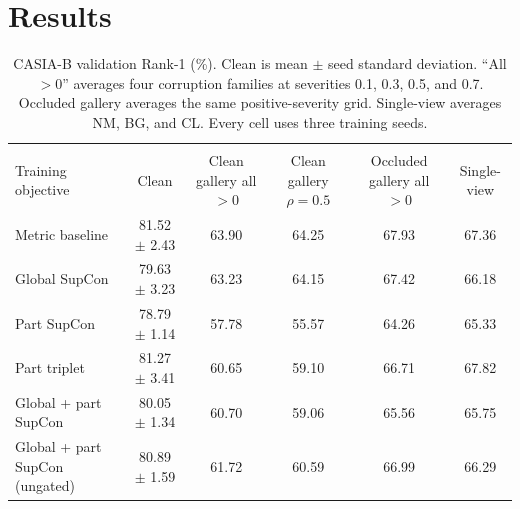 \documentclass[runningheads]{llncs}
\begin{document}
\section{Results}

\begin{table}[!t]
\centering
\caption{CASIA-B validation Rank-1 (\%). Clean is mean $\pm$ seed standard
deviation. ``All $>0$'' averages four corruption families at severities 0.1,
0.3, 0.5, and 0.7. Occluded gallery averages the same positive-severity grid.
Single-view averages NM, BG, and CL. Every cell uses three training seeds.}
\label{tab:factorial-results}
\small
\setlength{\tabcolsep}{4pt}
\begin{tabularx}{\textwidth}{@{}>{\raggedright\arraybackslash}Xccccc@{}}
\toprule
\multicolumn{6}{@{}l}{\emph{Global descriptor}} \\
Training objective & Clean & \shortstack{Clean gallery\\all $>0$} &
\shortstack{Clean gallery\\$\rho=0.5$} & \shortstack{Occluded gallery\\all $>0$} &
Single-view \\
\midrule
Metric baseline & 81.52 $\pm$ 2.43 & 63.90 & 64.25 & 67.93 & 67.36 \\
Global SupCon & 79.63 $\pm$ 3.23 & 63.23 & 64.15 & 67.42 & 66.18 \\
Part SupCon & 78.79 $\pm$ 1.14 & 57.78 & 55.57 & 64.26 & 65.33 \\
Part triplet & 81.27 $\pm$ 3.41 & 60.65 & 59.10 & 66.71 & 67.82 \\
Global + part SupCon & 80.05 $\pm$ 1.34 & 60.70 & 59.06 & 65.56 & 65.75 \\
Global + part SupCon (ungated) & 80.89 $\pm$ 1.59 & 61.72 & 60.59 & 66.99 & 66.29 \\
\bottomrule
\end{tabularx}
\vspace{0.5em}


\end{table}
\end{document}
